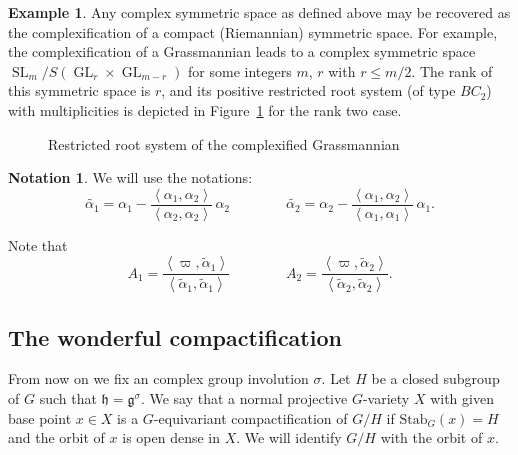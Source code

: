 \documentclass[10pt]{amsart}
\theoremstyle{plain}
\theoremstyle{definition}
\newtheorem{exa}[thm]{Example}
\newtheorem{nota}[thm]{Notation}
\DeclareMathOperator{\SL}{SL}
\DeclareMathOperator{\GL}{GL}
\begin{document}
\begin{exa}
Any complex symmetric space as defined above may be recovered as the complexification
of a compact (Riemannian) symmetric space. For example, the complexification of a
Grassmannian leads to a complex symmetric space
$\SL_m/S(\GL_r\times \GL_{m-r})$ for some integers $m$, $r$ with $r\leq m/2$.
The rank of this symmetric space is $r$,
and its positive restricted root system (of type $BC_2$) with multiplicities is depicted
in Figure~\ref{fig:AIII} for the rank two case.
\begin{figure}
\smaller \smaller\centering
{}
\caption{Restricted root system of the complexified Grassmannian}
\label{fig:AIII}
\end{figure}
\end{exa}

\begin{nota}
We will use the notations:
\[ \tilde{\alpha_1} = \alpha_1 - \frac{\left<\alpha_1,\alpha_2\right>}{\left<\alpha_2,\alpha_2\right>}\,\alpha_2
\qquad \qquad
\tilde{\alpha_2}= \alpha_2 - \frac{\left<\alpha_1,\alpha_2\right>}{\left<\alpha_1,\alpha_1\right>}\,\alpha_1. \]
\end{nota}

Note that
\[ A_1=\frac{\left<\varpi,\tilde{\alpha}_1\right>}{\left<\tilde{\alpha}_1,\tilde{\alpha}_1\right>}
\qquad \qquad
A_2=\frac{\left<\varpi,\tilde{\alpha}_2\right>}{\left<\tilde{\alpha}_2,\tilde{\alpha}_2\right>}. \]

\subsection{The wonderful compactification}

From now on we fix an complex group involution $\sigma$.
Let $H$ be a closed subgroup of $G$ such that $\mathfrak{h}=\mathfrak{g}^{\sigma}$.
We say that a normal projective $G$-variety $X$ with given base point $x\in X$ is
a $G$-equivariant compactification of $G/H$ if $\mathrm{Stab}_G(x)=H$ and the orbit
of $x$ is open dense in $X$.
We will identify $G/H$ with the orbit of $x$.
\end{document}
